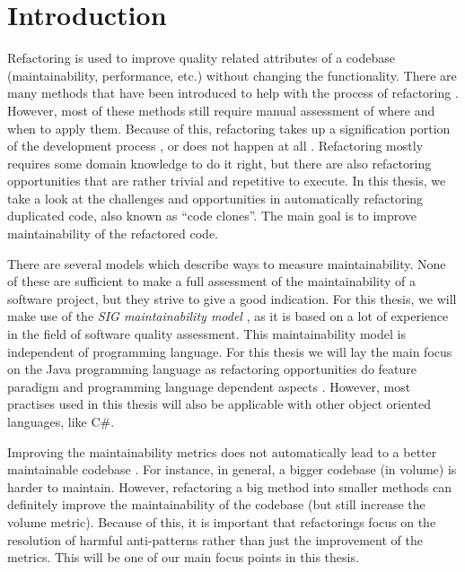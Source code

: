 \documentclass{report}
\theoremstyle{definition}
\theoremstyle{remark}
\begin{document}
\newpage
\chapter{Introduction}
Refactoring is used to improve quality related attributes of a codebase (maintainability, performance, etc.) without changing the functionality. There are many methods that have been introduced to help with the process of refactoring \cite{fowler2018refactoring, wake2004refactoring}. However, most of these methods still require manual assessment of where and when to apply them. Because of this, refactoring takes up a signification portion of the development process \cite{lientz1978characteristics, mens2004survey}, or does not happen at all \cite{mens2003refactoring}. Refactoring mostly requires some domain knowledge to do it right, but there are also refactoring opportunities that are rather trivial and repetitive to execute. In this thesis, we take a look at the challenges and opportunities in automatically refactoring duplicated code, also known as ``code clones''. The main goal is to improve maintainability of the refactored code.

There are several models which describe ways to measure maintainability. None of these are sufficient to make a full assessment of the maintainability of a software project, but they strive to give a good indication. For this thesis, we will make use of the \textit{SIG maintainability model} \cite{heitlager2007practical}, as it is based on a lot of experience in the field of software quality assessment. This maintainability model is independent of programming language. For this thesis we will lay the main focus on the Java programming language as refactoring opportunities do feature paradigm and programming language dependent aspects \cite{choi2011extracting}. However, most practises used in this thesis will also be applicable with other object oriented languages, like C\#.

Improving the maintainability metrics does not automatically lead to a better maintainable codebase \cite{fenton1999software}. For instance, in general, a bigger codebase (in volume) is harder to maintain. However, refactoring a big method into smaller methods can definitely improve the maintainability of the codebase (but still increase the volume metric). Because of this, it is important that refactorings focus on the resolution of harmful anti-patterns \cite{kapser2006cloning} rather than just the improvement of the metrics. This will be one of our main focus points in this thesis.
\end{document}
